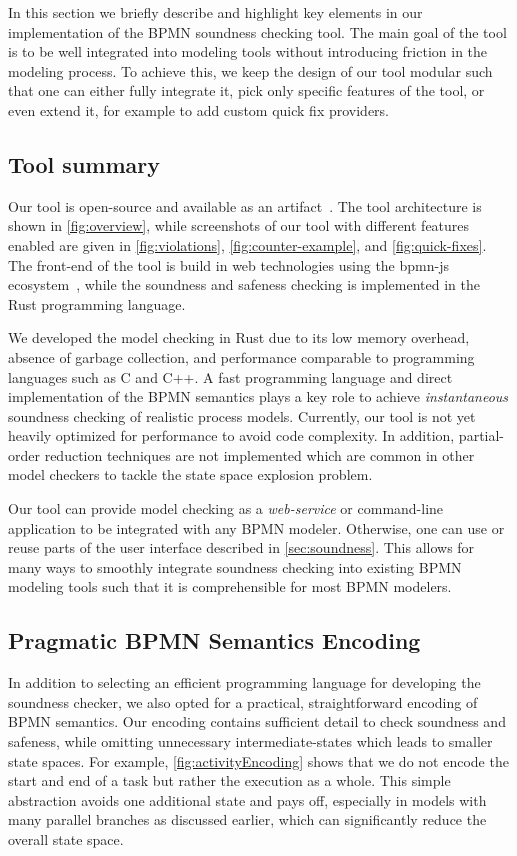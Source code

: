 \documentclass[runningheads]{llncs}
\begin{document}
In this section we briefly describe and highlight key elements in our implementation of the BPMN soundness checking tool.
The main goal of the tool is to be well integrated into modeling tools without introducing friction in the modeling process.
To achieve this, we keep the design of our tool modular such that one can either fully integrate it, pick only specific features of the tool, or even extend it, for example to add custom quick fix providers.

\subsection{Tool summary}
Our tool is open-source and available as an artifact~\cite{noauthorgivenBPM2024Artifacts2024}.
The tool architecture is shown in \autoref{fig:overview}, while screenshots of our tool with different features enabled are given in \autoref{fig:violations}, \autoref{fig:counter-example}, and \autoref{fig:quick-fixes}.
The front-end of the tool is build in web technologies using the bpmn-js ecosystem~\cite{camundaservicesgmbhBpmnjsTokenSimulation2024}, while the soundness and safeness checking is implemented in the Rust programming language.

We developed the model checking in Rust due to its low memory overhead, absence of garbage collection, and performance comparable to programming languages such as C and C++.
A fast programming language and direct implementation of the BPMN semantics plays a key role to achieve \textit{instantaneous} soundness checking of realistic process models.
Currently, our tool is not yet heavily optimized for performance to avoid code complexity.
In addition, partial-order reduction techniques are not implemented which are common in other model checkers to tackle the state space explosion problem.

Our tool can provide model checking as a \textit{web-service} or command-line application to be integrated with any BPMN modeler.
Otherwise, one can use or reuse parts of the user interface described in \autoref{sec:soundness}.
This allows for many ways to smoothly integrate soundness checking into existing BPMN modeling tools such that it is comprehensible for most BPMN modelers.

\subsection{Pragmatic BPMN Semantics Encoding}
In addition to selecting an efficient programming language for developing the soundness checker, we also opted for a practical, straightforward encoding of BPMN semantics.
Our encoding contains sufficient detail to check soundness and safeness, while omitting unnecessary intermediate-states which leads to smaller state spaces.
For example, \autoref{fig:activityEncoding} shows that we do not encode the start and end of a task but rather the execution as a whole.
This simple abstraction avoids one additional state and pays off, especially in models with many parallel branches as discussed earlier, which can significantly reduce the overall state space.
\end{document}
